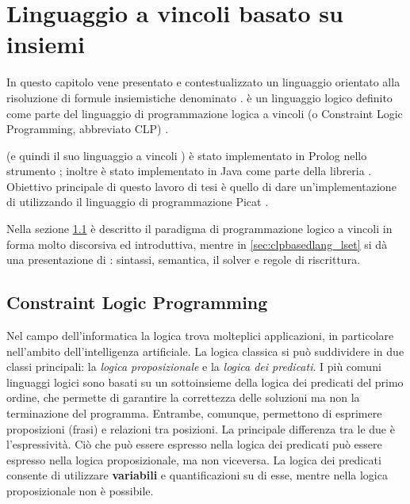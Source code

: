\documentclass[12pt,a4paper,openright]{book} %
\newenvironment{dedication}                   %
  {%
   \thispagestyle{empty}%
   \vspace*{\stretch{1}}%
   \itshape             %
   \raggedleft          %
  }
  {\par %
   \vspace{\stretch{3}} %
   \clearpage           %
  }
\begin{document}

\tableofcontents
\listoffigures
\listofalgorithms




\lipsum[1-4]
\thispagestyle{empty}


\chapter{Linguaggio a vincoli basato su insiemi}
\label{ch:clpbasedlang}

\minitoc

In questo capitolo vene presentato e contestualizzato un linguaggio
orientato alla risoluzione di formule insiemistiche denominato
\lset{}. \lset{} è un linguaggio logico definito come parte del
linguaggio di programmazione logica a vincoli (o Constraint Logic
Programming, abbreviato CLP) \clpset{}.

\clpset{} (e quindi il suo linguaggio a vincoli \lset{}) è stato
implementato in Prolog nello strumento \setlog{} \cite{SetLog};
inoltre \lset{} è stato implementato in Java come parte della libreria
\jsetl{} \cite{JSetL}. Obiettivo principale di questo lavoro di tesi è
quello di dare un’implementazione di \lset{} utilizzando il linguaggio
di programmazione Picat \cite{PicatLang}.

Nella sezione \ref{sec:clpbasedlang_clp} è descritto il paradigma di
programmazione logico a vincoli in forma molto discorsiva ed
introduttiva, mentre in \ref{sec:clpbasedlang_lset} si dà una
presentazione di \lset{}: sintassi, semantica, il solver e regole di
riscrittura.

\section{Constraint Logic Programming}
\label{sec:clpbasedlang_clp}

Nel campo dell'informatica la logica trova molteplici applicazioni, in
particolare nell'ambito dell'intelligenza artificiale. La logica
classica si può suddividere in due classi principali: la \emph{logica
  proposizionale} e la \emph{logica dei predicati}.  I più comuni
linguaggi logici sono basati su un sottoinsieme della logica dei
predicati del primo ordine, che permette di garantire la correttezza
delle soluzioni ma non la terminazione del programma. Entrambe,
comunque, permettono di esprimere proposizioni (frasi) e relazioni tra
posizioni. La principale differenza tra le due è l'espressività. Ciò
che può essere espresso nella logica dei predicati può essere espresso
nella logica proposizionale, ma non viceversa. La logica dei predicati
consente di utilizzare \textbf{variabili} e quantificazioni su di
esse, mentre nella logica proposizionale non è possibile.
\end{document}
